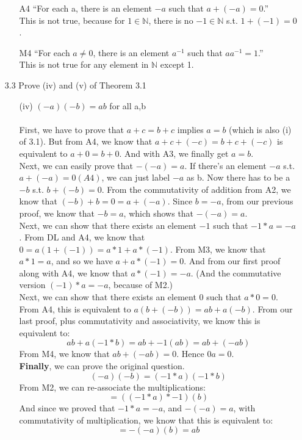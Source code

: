 \begin{itemize}
    \begin{itemize}
      \item [A4] ``For each a, there is an element $-a$ such that $a + (-a) = 0$.''\\
        This is not true, because for $1 \in \mathds{N}$, there is no $-1 \in \mathds{N}$ s.t. $1 + (-1) = 0$.
      \item [M4] ``For each $a \neq 0$, there is an element $a^{-1}$ such that $aa^{-1} = 1$.''\\
        This is not true for any element in $\mathds{N}$ except 1.
    \end{itemize}
  \item[3.3]
    Prove (iv) and (v) of Theorem 3.1
    \begin{itemize}
      \item [(iv)] $(-a)(-b) = ab$ for all a,b\\\\
        First, we have to prove that $a + c = b + c$ implies $a = b$ (which is also (i) of 3.1). But from A4, we know that $a + c + (-c) = b + c + (-c)$ is equivalent to $a + 0 = b + 0$. And with A3, we finally get $a = b$.\\


        Next, we can easily prove that $-(-a) = a$. If there's an element $-a$ s.t. $a + (-a) = 0 (A4)$, we can just label $-a$ as b. Now there has to be a $-b$ s.t. $b + (-b) = 0$. From the commutativity of addition from A2, we know that $(-b) + b = 0 = a + (-a)$. Since $b = -a$, from our previous proof, we know that $-b = a$, which shows that $-(-a) = a$.\\

        Next, we can show that there exists an element $-1$ such that $-1 * a = -a$. From DL and A4, we know that $0 = a(1 + (-1)) = a*1 + a*(-1)$. From M3, we know that $a * 1 = a$, and so we have $a + a*(-1) = 0$. And from our first proof along with A4, we know that $a*(-1) = -a$. (And the commutative version $(-1)*a = -a$, because of M2.)\\

        Next, we can show that there exists an element $0$ such that $a * 0 = 0$. From A4, this is equivalent to $a(b + (-b)) = ab + a(-b)$. From our last proof, plus commutativity and associativity, we know this is equivalent to:
        $$ab + a(-1 * b) = ab + -1(ab) = ab + (-ab)$$
        From M4, we know that $ab + (-ab) = 0$. Hence $0a = 0$.\\
        
        \textbf{Finally}, we can prove the original question.
        $$(-a)(-b) = (-1*a)(-1*b)$$
        From M2, we can re-associate the multiplications:
        $$= ((-1*a)*-1)(b)$$
        And since we proved that $-1 * a = -a$, and $-(-a) = a$, with commutativity of multiplication, we know that this is equivalent to:
        $$= -(-a)(b) = ab$$        
        

\end{itemize}
\end{itemize}
